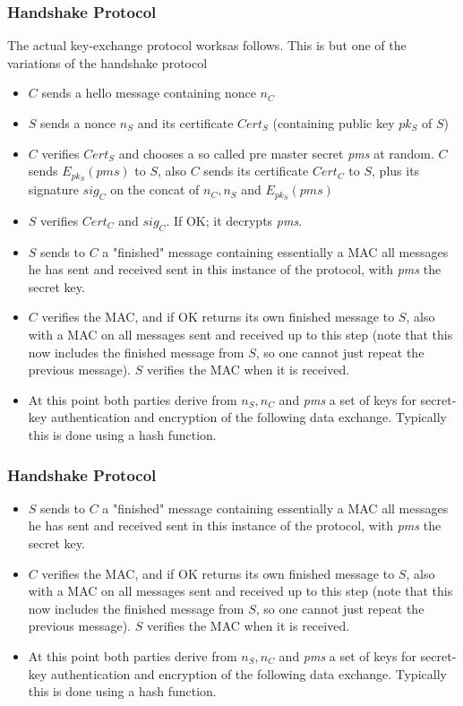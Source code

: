                 \begin{frame}
                    \frametitle{Handshake Protocol}
                        The actual key-exchange protocol worksas follows. This is but one of the variations of the handshake protocol
                        \begin{itemize}
                            \item $C$ sends a hello message containing nonce $n_C$
                            \item $S$ sends a nonce $n_S$ and its certificate $Cert_S$ (containing public key $pk_S$ of $S$)
                            \item $C$ verifies $Cert_S$ and chooses a so called pre master secret \textit{pms} at random. $C$ sends $E_{pk_S}(pms)$ to $S$, also $C$ sends its certificate $Cert_C$ to $S$, plus its signature $sig_C$ on the concat of $n_C, n_S$ and $E_{pk_S}(pms)$
                            \item $S$ verifies $Cert_C$ and $sig_C$. If OK; it decrypts \textit{pms}. 
                            \item $S$ sends to $C$ a "finished" message containing essentially a MAC all messages he has sent and received sent in this instance of the protocol, with \textit{pms} the secret key.
                            \item $C$ verifies the MAC, and if OK returns its own finished message to $S$, also with a MAC on all messages sent and received up to this step (note that this now includes the finished message from $S$, so one cannot just repeat the previous message). $S$ verifies the MAC when it is received.
                            \item At this point both parties derive from $n_S,n_C$ and \textit{pms} a set of keys for secret-key authentication and encryption of the following data exchange. Typically this is done using a hash function.
                        \end{itemize}
                \end{frame}
            \begin{frame}
                \frametitle{Handshake Protocol}
                    \begin{itemize}
                        \item $S$ sends to $C$ a "finished" message containing essentially a MAC all messages he has sent and received sent in this instance of the protocol, with \textit{pms} the secret key.
                        \item $C$ verifies the MAC, and if OK returns its own finished message to $S$, also with a MAC on all messages sent and received up to this step (note that this now includes the finished message from $S$, so one cannot just repeat the previous message). $S$ verifies the MAC when it is received.
                        \item At this point both parties derive from $n_S,n_C$ and \textit{pms} a set of keys for secret-key authentication and encryption of the following data exchange. Typically this is done using a hash function.
                    \end{itemize}
            \end{frame}
